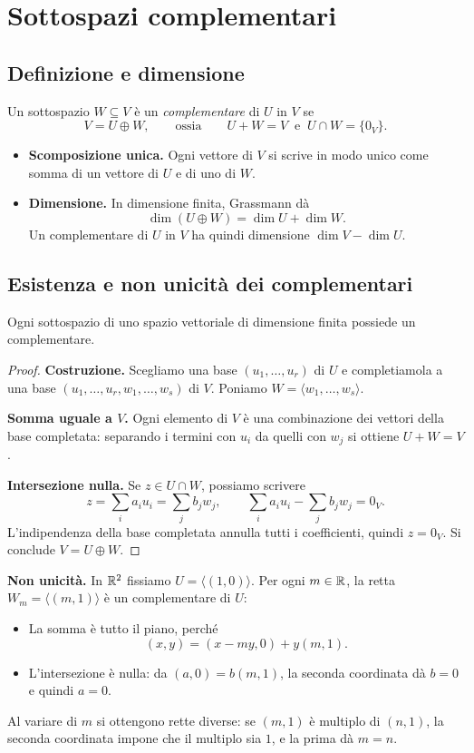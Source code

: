 \section{Sottospazi complementari}

\subsection{Definizione e dimensione}
\begin{definizione}
Un sottospazio $W\subseteq V$ è un \emph{complementare} di $U$ in $V$ se
\[
  V=U\oplus W,
  \qquad\text{ossia}\qquad U+W=V\ \text{ e }\ U\cap W=\{0_V\}.
\]
\end{definizione}
\begin{itemize}
  \item \textbf{Scomposizione unica.} Ogni vettore di $V$ si scrive in modo unico come somma di un vettore di $U$ e di uno di $W$.
  \item \textbf{Dimensione.} In dimensione finita, Grassmann dà
  \[
    \dim(U\oplus W)=\dim U+\dim W.
  \]
  Un complementare di $U$ in $V$ ha quindi dimensione $\dim V-\dim U$.
\end{itemize}

\subsection{Esistenza e non unicità dei complementari}
\begin{proposizione}
Ogni sottospazio di uno spazio vettoriale di dimensione finita possiede un complementare.
\end{proposizione}
\begin{proof}
\textbf{Costruzione.} Scegliamo una base $(u_1,\ldots,u_r)$ di $U$ e completiamola a una base $(u_1,\ldots,u_r,w_1,\ldots,w_s)$ di $V$. Poniamo $W=\langle w_1,\ldots,w_s\rangle$.

\textbf{Somma uguale a $V$.} Ogni elemento di $V$ è una combinazione dei vettori della base completata: separando i termini con $u_i$ da quelli con $w_j$ si ottiene $U+W=V$.

\textbf{Intersezione nulla.} Se $z\in U\cap W$, possiamo scrivere
\[
  z=\sum_i a_iu_i=\sum_j b_jw_j,
  \qquad \sum_i a_iu_i-\sum_j b_jw_j=0_V.
\]
L'indipendenza della base completata annulla tutti i coefficienti, quindi $z=0_V$. Si conclude $V=U\oplus W$.
\end{proof}

\textbf{Non unicità.} In $\mathbb{R}^2$ fissiamo $U=\langle(1,0)\rangle$. Per ogni $m\in\mathbb{R}$, la retta $W_m=\langle(m,1)\rangle$ è un complementare di $U$:
\begin{itemize}
  \item La somma è tutto il piano, perché
  \[
    (x,y)=(x-my,0)+y(m,1).
  \]
  \item L'intersezione è nulla: da $(a,0)=b(m,1)$, la seconda coordinata dà $b=0$ e quindi $a=0$.
\end{itemize}
Al variare di $m$ si ottengono rette diverse: se $(m,1)$ è multiplo di $(n,1)$, la seconda coordinata impone che il multiplo sia $1$, e la prima dà $m=n$.

